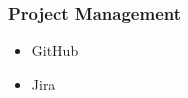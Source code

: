 \documentclass[letterpaper]{article}
\begin{document}
\begin{fullwidth}[width=\linewidth+2cm]
\begin{minipage}[t]{0.25\linewidth}
\begin{tcolorbox}[breakable, capture=minipage, title=Skills]
    \subsubsection*{Project Management}
    \begin{itemize}
    \item GitHub
    \item Jira
    \end{itemize} %
  \end{tcolorbox}
\end{minipage}


\end{fullwidth}
\end{document}
